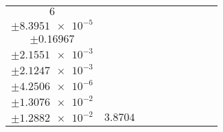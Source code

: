 \documentclass[8pt]{article}
\begin{document}
\begin{longtable}[l]{c c c c c c c c c}
$\num{6}$ & \begin{tabular}[c]{@{}c@{}}$\num{2.9292e-2}$ \\ $\pm\num{8.3951e-5}$\end{tabular} & \begin{tabular}[c]{@{}c@{}}$\num{0.88915}$ \\ $\pm\num{0.16967}$\end{tabular} & \begin{tabular}[c]{@{}c@{}}$\num{11.41}$ \\ $\pm\num{2.1551e-3}$\end{tabular} & \begin{tabular}[c]{@{}c@{}}$\num{1.1911e+3}$ \\ $\pm\num{2.1247e-3}$\end{tabular} & \begin{tabular}[c]{@{}c@{}}$\num{2.3828}$ \\ $\pm\num{4.2506e-6}$\end{tabular} & \begin{tabular}[c]{@{}c@{}}$\num{3.8815}$ \\ $\pm\num{1.3076e-2}$\end{tabular} & \begin{tabular}[c]{@{}c@{}}$\num{3.8274}$ \\ $\pm\num{1.2882e-2}$\end{tabular} & $\num{3.8704}$\\
\bottomrule
\end{longtable}
\end{document}
